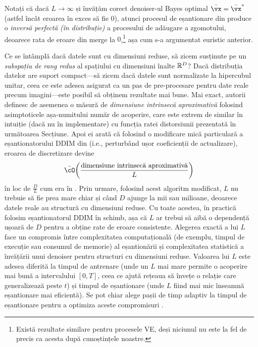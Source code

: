 \documentclass[../../book-main_ro.tex]{subfiles}
\begin{document}
Notați că dacă \(L \to \infty\) și învățăm corect denoiser-ul Bayes optimal \(\bar{\vx} = \bar{\vx}^{\ast}\) (astfel încât eroarea în exces să fie \(0\)), atunci procesul de eșantionare din  produce o \textit{inversă perfectă (în distribuție)} a procesului de adăugare a zgomotului, deoarece rata de eroare din  merge la \(0\),\footnote{Există rezultate similare pentru procesele VE, deși niciunul nu este la fel de precis ca acesta după cunoștințele noastre.} așa cum s-a argumentat euristic anterior.

\begin{remark}
	Ce se întâmplă dacă datele sunt cu dimensiuni reduse, să zicem susținute pe un \textit{subspațiu de rang redus} al spațiului cu dimensiuni înalte \(\mathbb{R}^{D}\)? Dacă distribuția datelor are suport compact---să zicem dacă datele sunt normalizate la hipercubul unitar, ceea ce este adesea asigurat ca un pas de pre-procesare pentru date reale precum imagini---este posibil să obținem rezultate mai bune. Mai exact, autorii \cite{li2024d} definesc de asemenea o măsură de \textit{dimensiune intrinsecă aproximativă} folosind asimptoticele așa-numitului număr de acoperire, care este extrem de similar în intuiție (dacă nu în implementare) cu funcția ratei distorsiunii prezentată în următoarea Secțiune. Apoi ei arată că folosind o modificare mică particulară a eșantionatorului DDIM din  (i.e., perturbând ușor coeficienții de actualizare), eroarea de discretizare devine
	\begin{equation}
		\tilde{\cO}\rp{\frac{\text{dimensiune intrinsecă aproximativă}}{L}}
	\end{equation}
	în loc de \(\frac{D}{L}\) cum era în . Prin urmare, folosind acest algoritm modificat, \(L\) nu trebuie să fie prea mare chiar și când \(D\) ajunge la mii sau milioane, deoarece datele reale au structură cu dimensiuni reduse. Cu toate acestea, în practică folosim eșantionatorul DDIM în schimb, așa că \(L\) ar trebui să aibă o dependență ușoară de \(D\) pentru a obține rate de eroare consistente. Alegerea exactă a lui \(L\) face un compromis între complexitatea computațională (de exemplu, timpul de execuție sau consumul de memorie) al eșantionării și complexitatea statistică a învățării unui denoiser pentru structuri cu dimensiuni reduse. Valoarea lui \(L\) este adesea diferită la timpul de antrenare (unde un \(L\) mai mare permite o acoperire mai bună a intervalului \([0, T]\), ceea ce ajută rețeaua să învețe o relație care generalizează peste \(t\)) și timpul de eșantionare (unde \(L\) fiind mai mic înseamnă eșantionare mai eficientă). Se pot chiar alege pașii de timp adaptiv la timpul de eșantionare pentru a optimiza aceste compromisuri \cite{bao2022analytic}.
\end{remark}
\end{document}
